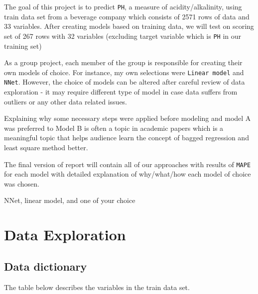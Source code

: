 \documentclass[]{report}
\newenvironment{Shaded}{\begin{snugshade}}{\end{snugshade}}
\newcommand{\DataTypeTok}[1]{\textcolor[rgb]{0.13,0.29,0.53}{#1}}
\newcommand{\KeywordTok}[1]{\textcolor[rgb]{0.13,0.29,0.53}{\textbf{#1}}}
\newcommand{\NormalTok}[1]{#1}
\newcommand{\OperatorTok}[1]{\textcolor[rgb]{0.81,0.36,0.00}{\textbf{#1}}}
\newcommand{\StringTok}[1]{\textcolor[rgb]{0.31,0.60,0.02}{#1}}
\begin{document}
The goal of this project is to predict \texttt{PH}, a measure of
acidity/alkalinity, using train data set from a beverage company which
consists of 2571 rows of data and 33 variables. After creating models
based on training data, we will test on scoring set of 267 rows with 32
variables (excluding target variable which is \texttt{PH} in our
training set)

As a group project, each member of the group is responsible for creating
their own models of choice. For instance, my own selections were
\texttt{Linear\ model} and \texttt{NNet}. However, the choice of models
can be altered after careful review of data exploration - it may require
different type of model in case data suffers from outliers or any other
data related issues.

Explaining why some necessary steps were applied before modeling and
model A was preferred to Model B is often a topic in academic papers
which is a meaningful topic that helps audience learn the concept of
bagged regression and least square method better.

The final version of report will contain all of our approaches with
results of \texttt{MAPE} for each model with detailed explanation of
why/what/how each model of choice was chosen.

NNet, linear model, and one of your choice

\newpage

\hypertarget{data-exploration}{%
\chapter{Data Exploration}\label{data-exploration}}

\hypertarget{data-dictionary}{%
\section{Data dictionary}\label{data-dictionary}}

The table below describes the variables in the train data set.

\begin{Shaded}
\end{Shaded}
\end{document}
